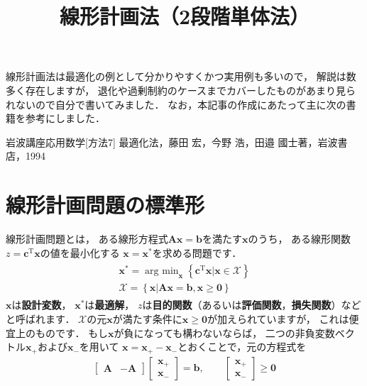 ﻿\documentclass[a4paper]{jsarticle}
\title{線形計画法（2段階単体法）}
\begin{document}
\maketitle

線形計画法は最適化の例として分かりやすくかつ実用例も多いので，
解説は数多く存在しますが，
退化や過剰制約のケースまでカバーしたものがあまり見られないので自分で書いてみました．
なお，本記事の作成にあたって主に次の書籍を参考にしました．

岩波講座応用数学[方法7] 最適化法，藤田 宏，今野 浩，田邉 國士著，岩波書店，1994

\section{線形計画問題の標準形}

線形計画問題とは，
ある線形方程式$\boldsymbol{A}\boldsymbol{x}=\boldsymbol{b}$を満たす$\boldsymbol{x}$のうち，
ある線形関数$z=\boldsymbol{c}^{\mathrm{T}}\boldsymbol{x}$の値を最小化する
$\boldsymbol{x}=\boldsymbol{x}^{*}$を求める問題です．
\begin{align}
\begin{array}{c}
\boldsymbol{x}^{*}=\mathop{\mathrm{arg~min}}_{\boldsymbol{x}}\left\{\boldsymbol{c}^{\mathrm{T}}\boldsymbol{x}
\left|\boldsymbol{x}\in\mathcal{X}\right.
\right\}
\\
\mathcal{X}=\left\{\boldsymbol{x}\left|
\boldsymbol{A}\boldsymbol{x}=\boldsymbol{b},
\boldsymbol{x}\geq\boldsymbol{0}
\right.
\right\}
\end{array}
\label{pb:lp}
\end{align}
$\boldsymbol{x}$は{\bf 設計変数}，
$\boldsymbol{x}^{*}$は{\bf 最適解}，
$z$は{\bf 目的関数}（あるいは{\bf 評価関数}，{\bf 損失関数}）などと呼ばれます．
$\mathcal{X}$の元$\boldsymbol{x}$が満たす条件に$\boldsymbol{x}\geq\boldsymbol{0}$が加えられていますが，
これは便宜上のものです．
もし$\boldsymbol{x}$が負になっても構わないならば，
二つの非負変数ベクトル$\boldsymbol{x}_{+}$および$\boldsymbol{x}_{-}$を用いて
$\boldsymbol{x}=\boldsymbol{x}_{+}-\boldsymbol{x}_{-}$とおくことで，元の方程式を
\begin{align*}
\begin{bmatrix}
\boldsymbol{A} & -\boldsymbol{A}
\end{bmatrix}
\begin{bmatrix}
\boldsymbol{x}_{+} \\ \boldsymbol{x}_{-}
\end{bmatrix}
=
\boldsymbol{b},\qquad
\begin{bmatrix}
\boldsymbol{x}_{+} \\ \boldsymbol{x}_{-}
\end{bmatrix}
\geq\boldsymbol{0}
\end{align*}
\end{document}
